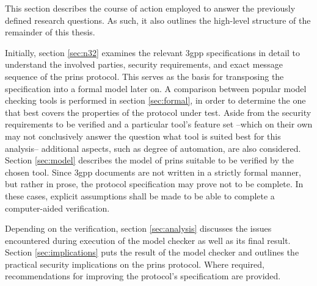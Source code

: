 This section describes the course of action employed to answer the previously defined research questions.
As such, it also outlines the high-level structure of the remainder of this thesis.

Initially, section \ref{sec:n32} examines the relevant \gls{3gpp} specifications in detail to understand the involved parties, security requirements, and exact message sequence of the \gls{prins} protocol.
This serves as the basis for transposing the specification into a formal model later on.
A comparison between popular model checking tools is performed in section \ref{sec:formal}, in order to determine the one that best covers the properties of the protocol under test.
Aside from the security requirements to be verified and a particular tool's feature set --which on their own may not conclusively answer the question what tool is suited best for this analysis-- additional aspects, such as degree of automation, are also considered.
Section \ref{sec:model} describes the model of \gls{prins} suitable to be verified by the chosen tool.
Since \gls{3gpp} documents are not written in a strictly formal manner, but rather in prose, the protocol specification may prove not to be complete.
In these cases, explicit assumptions shall be made to be able to complete a computer-aided verification.

Depending on the verification, section \ref{sec:analysis} discusses the issues encountered during execution of the model checker as well as its final result.
Section \ref{sec:implications} puts the result of the model checker and outlines the practical security implications on the \gls{prins} protocol.
Where required, recommendations for improving the protocol's specificatiom are provided.

